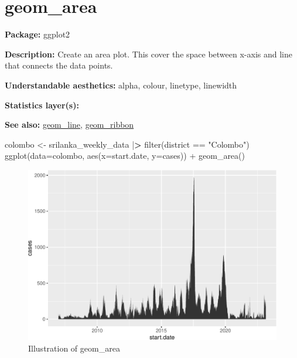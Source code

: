 \documentclass[
]{book}
\newenvironment{Shaded}{\begin{snugshade}}{\end{snugshade}}
\newcommand{\AttributeTok}[1]{\textcolor[rgb]{0.77,0.63,0.00}{#1}}
\newcommand{\ErrorTok}[1]{\textcolor[rgb]{0.64,0.00,0.00}{\textbf{#1}}}
\newcommand{\FunctionTok}[1]{\textcolor[rgb]{0.00,0.00,0.00}{#1}}
\newcommand{\NormalTok}[1]{#1}
\newcommand{\OtherTok}[1]{\textcolor[rgb]{0.56,0.35,0.01}{#1}}
\newcommand{\SpecialCharTok}[1]{\textcolor[rgb]{0.00,0.00,0.00}{#1}}
\newcommand{\StringTok}[1]{\textcolor[rgb]{0.31,0.60,0.02}{#1}}
\begin{document}
\hypertarget{area}{%
\section{geom\_area}\label{area}}

\textbf{Package: } ggplot2 \autocite{R-ggplot2}

\textbf{Description: }Create an area plot. This cover the space between x-axis and line that connects the data points.

\textbf{Understandable aesthetics:} alpha, colour, linetype, linewidth

\textbf{Statistics layer(s):}

\textbf{See also: } \protect\hyperlink{line}{geom\_line}, \protect\hyperlink{ribbon}{geom\_ribbon}

\begin{Shaded}
\begin{Highlighting}[]
\NormalTok{colombo }\OtherTok{\textless{}{-}}\NormalTok{ srilanka\_weekly\_data }\SpecialCharTok{|}\ErrorTok{\textgreater{}}
  \FunctionTok{filter}\NormalTok{(district }\SpecialCharTok{==} \StringTok{"Colombo"}\NormalTok{)}
\FunctionTok{ggplot}\NormalTok{(}\AttributeTok{data=}\NormalTok{colombo, }\FunctionTok{aes}\NormalTok{(}\AttributeTok{x=}\NormalTok{start.date, }\AttributeTok{y=}\NormalTok{cases)) }\SpecialCharTok{+} 
  \FunctionTok{geom\_area}\NormalTok{()}
\end{Highlighting}
\end{Shaded}

\begin{figure}
\centering
\includegraphics{Data-Visualisation-geom-Encyclopedia_files/figure-latex/unnamed-chunk-17-1.pdf}
\caption{\label{fig:unnamed-chunk-17}Illustration of geom\_area}
\end{figure}
\end{document}
